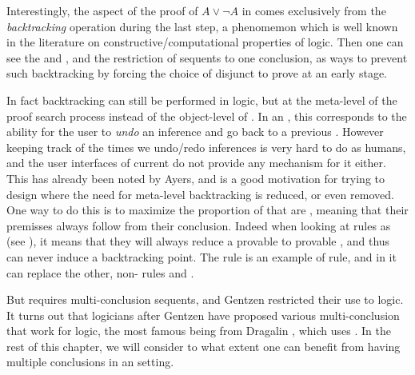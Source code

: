 Interestingly, the  aspect of the proof of $A \lor \neg A$ in
 comes exclusively from the \emph{backtracking} operation during
the last step, a phenomemon which is well known in the literature on
constructive/computational properties of  logic.
Then one can see the  {} and {},
and the restriction of  sequents to one conclusion, as ways to
prevent such backtracking by forcing the choice of disjunct to prove at an early
stage.

In fact backtracking can still be performed in  logic, but at the
meta-level of the proof search process instead of the object-level of . In an , this corresponds to the ability for the
user to \emph{undo} an inference and go back to a previous . However
keeping track of the times we undo/redo inferences is very hard to do as humans,
and the user interfaces of current  do not provide any mechanism
for it either. This has already been noted by Ayers, and is a good motivation for trying to design
 where the need for meta-level backtracking is reduced, or even
removed. One way to do this is to maximize the proportion of 
that are \emph{}, meaning that their premisses always follow from
their conclusion. Indeed when looking at rules as  (see ),
it means that they will always reduce a provable  to provable , and
thus can never induce a backtracking point. The {} rule is an example of
 rule, and in  it can replace the other, non- rules
{} and {}.

But {} requires multi-conclusion sequents, and Gentzen restricted
their use to  logic. It turns out that logicians after Gentzen have
proposed various multi-conclusion  that work for 
logic, the most famous being  from Dragalin
, which uses {}. In the rest of
this chapter, we will consider to what extent one can benefit from having
multiple conclusions in an  setting.

